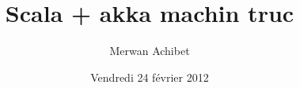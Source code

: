 \documentclass{beamer}
\title{Scala + akka machin truc}
\author{Merwan Achibet}
\institute{Université du Havre}
\date{Vendredi 24 février 2012}
\begin{document}
\maketitle


\begin{frame}

\end{frame}
\end{document}
